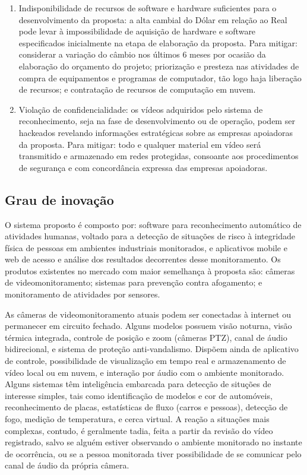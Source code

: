\begin{enumerate}
	\item Indisponibilidade de recursos de software e hardware suficientes para o desenvolvimento da proposta: a alta cambial do Dólar em relação ao Real pode levar à impossibilidade de aquisição de hardware e software especificados inicialmente na etapa de elaboração da proposta. Para mitigar: considerar a variação do câmbio nos últimos 6 meses por ocasião da elaboração do orçamento do projeto; priorização e presteza nas atividades de compra de equipamentos e programas de computador, tão logo haja liberação de recursos; e contratação de recursos de computação em nuvem.
	\item Violação de confidencialidade: os vídeos adquiridos pelo sistema de reconhecimento, seja na fase de desenvolvimento ou de operação, podem ser hackeados revelando informações estratégicas sobre as empresas apoiadoras da proposta. Para mitigar: todo e qualquer material em vídeo será transmitido e armazenado em redes protegidas, consoante aos procedimentos de segurança e com concordância expressa das empresas apoiadoras. 
\end{enumerate}


\subsection{Grau de inovação}
\label{ssec:inova}
O sistema proposto é composto por: software para reconhecimento automático de atividades humanas, voltado para a detecção de situações de risco à integridade física de pessoas em ambientes industriais monitorados, e aplicativos mobile e web de acesso e análise dos resultados decorrentes desse monitoramento. 
Os produtos existentes no mercado com maior semelhança à proposta são: câmeras de videomonitoramento; sistemas para prevenção contra afogamento; e monitoramento de atividades por sensores. 

As câmeras de videomonitoramento atuais podem ser conectadas à internet ou permanecer em circuito fechado. Alguns modelos possuem visão noturna, visão térmica integrada, controle de posição e zoom (câmeras PTZ), canal de áudio bidirecional, e sistema de proteção anti-vandalismo. Dispõem ainda de aplicativo de controle, possibilidade de visualização em tempo real e armazenamento de vídeo local ou em nuvem, e interação por áudio com o ambiente monitorado. Alguns sistemas têm inteligência embarcada para detecção de situções de interesse simples, tais como identificação de modelos e cor de automóveis, reconhecimento de placas, estatísticas de fluxo (carros e pessoas), detecção de fogo, medição de temperatura, e cerca virtual. A reação a situações mais complexas, contudo, é geralmente tadia, feita a partir da revisão do vídeo registrado, salvo se alguém estiver observando o ambiente monitorado no instante de ocorrência, ou se a pessoa monitorada tiver possibilidade de se comunicar pelo canal de áudio da própria câmera. 

